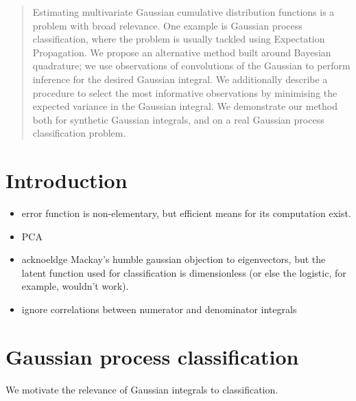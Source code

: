 \documentclass[twoside]{article}
\begin{document}

\begin{abstract}%
Estimating multivariate Gaussian cumulative distribution functions is a problem with broad relevance. One example is Gaussian process classification, where the problem is usually tackled using Expectation Propagation. We propose an alternative method built around Bayesian quadrature; we use observations of convolutions of the Gaussian to perform inference for the desired Gaussian integral. We additionally describe a procedure to select the most informative observations by minimising the expected variance in the Gaussian integral. We demonstrate our method both for synthetic Gaussian integrals, and on a real Gaussian process classification problem. 
\end{abstract}


\section{Introduction}

\begin{itemize}
 \item error function is non-elementary, but efficient means for its computation exist. 
 \item PCA
 \item acknoeldge Mackay's humble gaussian objection to eigenvectors, but the latent function used for \gp classification is dimensionless (or else the logistic, for example, wouldn't work).
\item ignore correlations between numerator and denominator integrals
\end{itemize}

\section{Gaussian process classification}

We motivate the relevance of Gaussian integrals to \gp classification.
\end{document}
